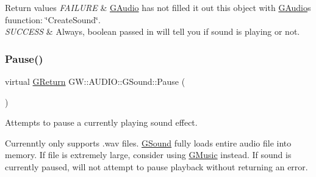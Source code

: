 \begin{DoxyRetVals}{Return values}
{\em F\+A\+I\+L\+U\+RE} & \mbox{\hyperlink{class_g_w_1_1_a_u_d_i_o_1_1_g_audio}{G\+Audio}} has not filled it out this object with \mbox{\hyperlink{class_g_w_1_1_a_u_d_i_o_1_1_g_audio}{G\+Audio}}\textquotesingle{}s fuunction\+: \char`\"{}\+Create\+Sound\char`\"{}. \\
\hline
{\em S\+U\+C\+C\+E\+SS} & Always, boolean passed in will tell you if sound is playing or not. \\
\hline
\end{DoxyRetVals}
\mbox{\label{class_g_w_1_1_a_u_d_i_o_1_1_g_sound_ababa7089fe9bf95d2763e4fde9c5a746}} 
\subsubsection{\texorpdfstring{Pause()}{Pause()}}
{\footnotesize\ttfamily virtual \mbox{\hyperlink{namespace_g_w_a67a839e3df7ea8a5c5686613a7a3de21}{G\+Return}} G\+W\+::\+A\+U\+D\+I\+O\+::\+G\+Sound\+::\+Pause (\begin{DoxyParamCaption}{ }\end{DoxyParamCaption})\hspace{0.3cm}{\ttfamily [pure virtual]}}



Attempts to pause a currently playing sound effect. 

Currenntly only supports .wav files. \mbox{\hyperlink{class_g_w_1_1_a_u_d_i_o_1_1_g_sound}{G\+Sound}} fully loads entire audio file into memory. If file is extremely large, consider using \mbox{\hyperlink{class_g_w_1_1_a_u_d_i_o_1_1_g_music}{G\+Music}} instead. If sound is currently paused, will not attempt to pause playback without returning an error.


